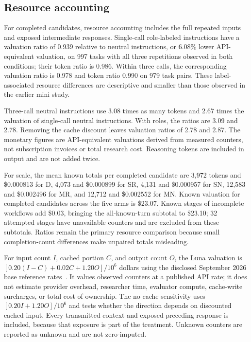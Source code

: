 


\subsection{Resource accounting}
For completed candidates, resource accounting includes the full repeated inputs and exposed intermediate responses. Single-call role-labeled instructions have a valuation ratio of 0.939 relative to neutral instructions, or 6.08\% lower API-equivalent valuation, on 997 tasks with all three repetitions observed in both conditions; their token ratio is 0.986. Within three calls, the corresponding valuation ratio is 0.978 and token ratio 0.990 on 979 task pairs. These label-associated resource differences are descriptive and smaller than those observed in the earlier mini study.

Three-call neutral instructions use 3.08 times as many tokens and 2.67 times the valuation of single-call neutral instructions. With roles, the ratios are 3.09 and 2.78. Removing the cache discount leaves valuation ratios of 2.78 and 2.87. The monetary figures are API-equivalent valuations derived from measured counters, not subscription invoices or total research cost. Reasoning tokens are included in output and are not added twice.

For scale, the mean known totals per completed candidate are 3,972 tokens and \$0.000813 for D, 4,073 and \$0.000899 for SR, 4,131 and \$0.000957 for SN, 12,583 and \$0.002496 for MR, and 12,712 and \$0.002552 for MN. Known valuation for completed candidates across the five arms is \$23.07. Known stages of incomplete workflows add \$0.03, bringing the all-known-turn subtotal to \$23.10; 32 attempted stages have unavailable counters and are excluded from these subtotals. Ratios remain the primary resource comparison because small completion-count differences make unpaired totals misleading.

For input count $I$, cached portion $C$, and output count $O$, the Luna valuation is $[0.20(I-C)+0.02C+1.20O]/10^6$ dollars using the disclosed September 2026 base reference rates~\cite{openai56luna2026,openaipricing2026}. It values observed counters at a published API rate; it does not estimate provider overhead, researcher time, evaluator compute, cache-write surcharges, or total cost of ownership. The no-cache sensitivity uses $[0.20I+1.20O]/10^6$ and tests whether the direction depends on discounted cached input. Every transmitted context and exposed preceding response is included, because that exposure is part of the treatment. Unknown counters are reported as unknown and are not zero-imputed.

